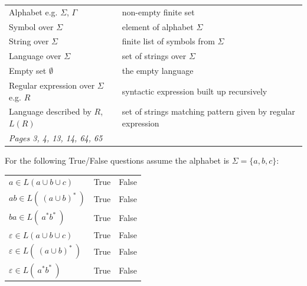 \begin{center}
    \begin{tabular}{|ll|}
    \hline
    Alphabet e.g. $\Sigma$, $\Gamma$ & 	non-empty finite set	 \\
    Symbol over $\Sigma$  & element of alphabet $\Sigma$\\
    String over $\Sigma$  &	finite list of symbols from $\Sigma$\\
    Language over $\Sigma$& set of strings over $\Sigma$ \\
    Empty set $\emptyset$ & the empty language\\
    Regular expression over $\Sigma$ e.g. $R$& syntactic expression built up recursively \\
    Language described by $R$,  $L(R)$ & set of strings matching pattern given by 
    regular expression\\
    \hline
    {\it Pages 3, 4, 13, 14, 64, 65}& \\
    \hline
    \end{tabular}
    \end{center}
    
    
    For the following True/False questions assume the alphabet is $\Sigma =  \{a,b,c\}$:
    
    \begin{center}
    \begin{tabular}{lcc}
    $a  \in L(a \cup b \cup c)$ & True & False \\
    $ab  \in L(~ (a \cup b)^*  ~)$ & True & False \\
    $ba \in L( ~ a^* b^* ~)$ & True & False \\
    $\varepsilon  \in L(a \cup b \cup c)$ & True & False \\
    $\varepsilon  \in L(~ (a \cup b)^*  ~)$ & True & False \\
    $\varepsilon \in L( ~ a^* b^* ~)$ & True & False \\
    \end{tabular}
    \end{center}
    
    
    
